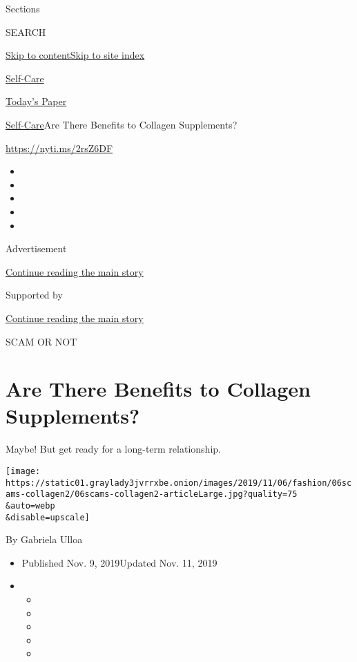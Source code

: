 Sections

SEARCH

\protect\hyperlink{site-content}{Skip to
content}\protect\hyperlink{site-index}{Skip to site index}

\href{https://www.nytimes3xbfgragh.onion/section/style/self-care/}{Self-Care}

\href{https://myaccount.nytimes3xbfgragh.onion/auth/login?response_type=cookie\&client_id=vi}{}

\href{https://www.nytimes3xbfgragh.onion/section/todayspaper}{Today's
Paper}

\href{/section/style/self-care/}{Self-Care}\textbar{}Are There Benefits
to Collagen Supplements?

\url{https://nyti.ms/2rsZ6DF}

\begin{itemize}
\item
\item
\item
\item
\item
\end{itemize}

Advertisement

\protect\hyperlink{after-top}{Continue reading the main story}

Supported by

\protect\hyperlink{after-sponsor}{Continue reading the main story}

SCAM OR NOT

\hypertarget{are-there-benefits-to-collagen-supplements}{%
\section{Are There Benefits to Collagen
Supplements?}\label{are-there-benefits-to-collagen-supplements}}

Maybe! But get ready for a long-term relationship.

\texttt{[image: https://static01.graylady3jvrrxbe.onion/images/2019/11/06/fashion/06scams-collagen2/06scams-collagen2-articleLarge.jpg?quality=75\\\&auto=webp\\\&disable=upscale]}

By Gabriela Ulloa

\begin{itemize}
\item
  Published Nov. 9, 2019Updated Nov. 11, 2019
\item
  \begin{itemize}
  \item
  \item
  \item
  \item
  \item
  \end{itemize}
\end{itemize}

